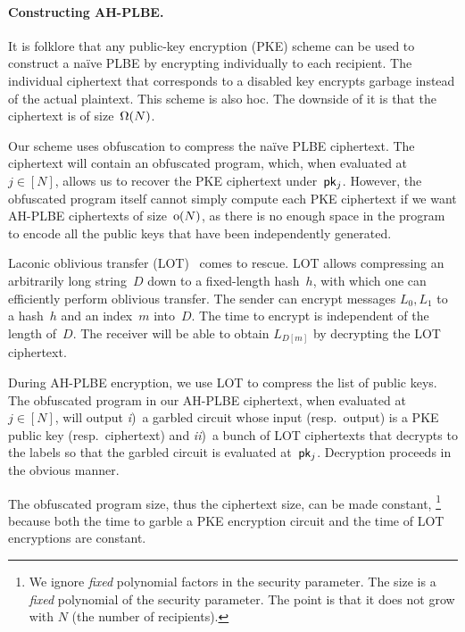 \paragraph{Constructing AH-PLBE.}
It is folklore that any public-key encryption (PKE) scheme can be used to construct a na{\"i}ve PLBE by encrypting individually to each recipient.
The individual ciphertext that corresponds to a disabled key encrypts garbage instead of the actual plaintext.
This scheme is also \ad hoc.
The downside of it is that the ciphertext is of size~$\operatorname{\Omega}(N)$.

Our scheme uses obfuscation to compress the na{\"i}ve PLBE ciphertext.
The ciphertext will contain an obfuscated program, which, when evaluated at~${j\in[N]}$, allows us to recover the PKE ciphertext under~$\pk_j$.
However, the obfuscated program itself cannot simply compute each PKE ciphertext if we want AH-PLBE ciphertexts of size~$\operatorname{o}(N)$, as there is no enough space in the program to encode all the public keys that have been independently generated.

Laconic oblivious transfer (LOT)~\cite{C:CDGGMP17} comes to rescue.
LOT allows compressing an arbitrarily long string~$D$ down to a fixed-length hash~$h$, with which one can efficiently perform oblivious transfer.
The sender can encrypt messages $L_0,L_1$ to a hash~$h$ and an index~$m$ into~$D$.
The time to encrypt is independent of the length of~$D$.
The receiver will be able to obtain $L_{D[m]}$ by decrypting the LOT ciphertext.

During AH-PLBE encryption, we use LOT to compress the list of public keys.
The obfuscated program in our AH-PLBE ciphertext, when evaluated at~${j\in[N]}$, will output
\emph{i})~a garbled circuit whose input (resp.~output) is a PKE public key (resp.~ciphertext) and
\emph{ii})~a bunch of LOT ciphertexts that decrypts to the labels so that the garbled circuit is evaluated at~$\pk_j$.
Decryption proceeds in the obvious manner.

The obfuscated program size, thus the ciphertext size, can be made constant,%
\footnote{We ignore \emph{fixed} polynomial factors in the security parameter.
The size is a \emph{fixed} polynomial of the security parameter.
The point is that it does not grow with $N$ (the number of recipients).}
because
both the time to garble a PKE encryption circuit and the time of LOT encryptions are constant.
